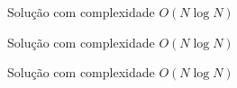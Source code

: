 \begin{frame}[fragile]{Solução com complexidade $O(N \log N)$}
\end{frame}

\begin{frame}[fragile]{Solução com complexidade $O(N \log N)$}
\end{frame}

\begin{frame}[fragile]{Solução com complexidade $O(N \log N)$}
\end{frame}
